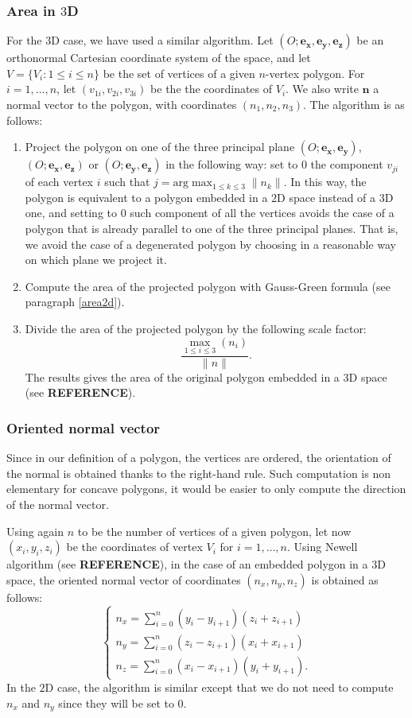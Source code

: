 \subsubsection{Area in $3$D}\label{area3d}
For the $3$D case, we have used a similar algorithm. Let $(O;\mathbf{e_x}, \mathbf{e_y}, \mathbf{e_z})$ be an orthonormal Cartesian coordinate system of the space, and let $V=\lbrace V_i : 1\leq i\leq n\rbrace$ be the set of vertices of a given $n$-vertex polygon. For $i=1,\ldots,n$, let $(v_{1i},v_{2i},v_{3i})$ be the the coordinates of $V_i$. We also write $\mathbf{n}$ a normal vector to the polygon, with coordinates $(n_1,n_2,n_3)$. The algorithm is as follows:
\begin{enumerate}
\item \label{pt1area3d} Project the polygon on one of the three principal plane $(O;\mathbf{e_x},\mathbf{e_y})$, $(O;\mathbf{e_x},\mathbf{e_z})$ or $(O;\mathbf{e_y},\mathbf{e_z})$ in the following way: set to $0$ the component $v_{ji}$ of each vertex $i$ such that $j=\text{arg} \max_{1\leq k \leq 3} \|n_k\|$. In this way, the polygon is equivalent to a polygon embedded in a $2$D space instead of a $3$D one, and setting to $0$ such component of all the vertices avoids the case of a polygon that is already parallel to one of the three principal planes. That is, we avoid the case of a degenerated polygon by choosing in a reasonable way on which plane we project it.  
\item Compute the area of the projected polygon with Gauss-Green formula (see paragraph \ref{area2d}). 
\item Divide the area of the projected polygon by the following scale factor: 
$$ \frac{\max_{1\leq i \leq 3}(n_i)}{\|n\|}. $$
The results gives the area of the original polygon embedded in a $3$D space (see \textbf{REFERENCE}).
\end{enumerate}

\subsubsection{Oriented normal vector}\label{onv}
Since in our definition of a polygon, the vertices are ordered, the orientation of the normal is obtained thanks to the right-hand rule. Such computation is non elementary for concave polygons, it would be easier to only compute the direction of the normal vector.

Using again $n$ to be the number of vertices of a given polygon, let now $(x_i,y_i,z_i)$ be the coordinates of vertex $V_i$ for $i=1,\ldots,n$. 
Using Newell algorithm (see \textbf{REFERENCE}), in the case of an embedded polygon in a $3$D space, the oriented normal vector of coordinates $(n_x,n_y,n_z)$ is obtained as follows:
$$
\begin{cases}
n_x=\sum_{i=0}^{n} (y_i-y_{i+1})(z_i+z_{i+1}) \\
n_y=\sum_{i=0}^{n} (z_i-z_{i+1})(x_i+x_{i+1}) \\
n_z=\sum_{i=0}^{n} (x_i-x_{i+1})(y_i+y_{i+1}). 
\end{cases}
$$
In the $2$D case, the algorithm is similar except that we do not need to compute $n_x$ and $n_y$ since they will be set to $0$. 


